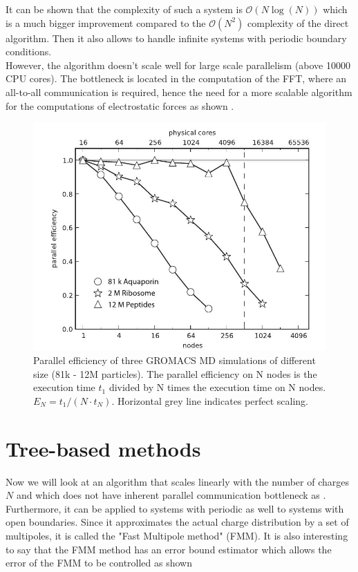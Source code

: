 \documentclass[10pt,twoside,a4paper]{report}
\begin{document}
It can be shown that the complexity of such a system is $\mathcal{O}(N \log(N))$ which is a much bigger improvement compared to the $\mathcal{O}(N^2)$ complexity of the direct algorithm. Then it also allows to handle infinite systems with periodic boundary conditions.\\ However, the algorithm doesn't scale well for large scale parallelism (above 10000 CPU cores)\cite{kutzner2013scaling}. The bottleneck is located in the computation of the FFT, where an all-to-all communication is required, hence the need for a more scalable algorithm for the computations of electrostatic forces as shown \cite{kutzner2013scaling}.

\begin{figure}[H]
\includegraphics[scale=0.6]{scalingMUC}
 \centering 
\caption{ Parallel efficiency of three GROMACS MD simulations of different size (81k - 12M particles). The parallel efficiency on N nodes is the execution time $t_1$ divided by N times the execution time on N nodes. $E_N = t_1 / (N\cdot t_N)$. Horizontal grey line indicates perfect scaling.}
\label{fig:scaling}
\end{figure}



\section{Tree-based methods}

Now we will look at an algorithm that scales linearly with the number of charges $N$ and which does not have inherent parallel communication bottleneck as \cite{kutzner2013scaling}.
Furthermore, it can be applied to systems with periodic as well to systems with open boundaries. Since it approximates the actual charge distribution by a set of multipoles, it is called the "Fast Multipole method" (FMM). It is also interesting to say that the FMM method has an error bound estimator which allows the error of the FMM to be controlled as shown \cite{dachsel2010corrected}
    
\end{document}
